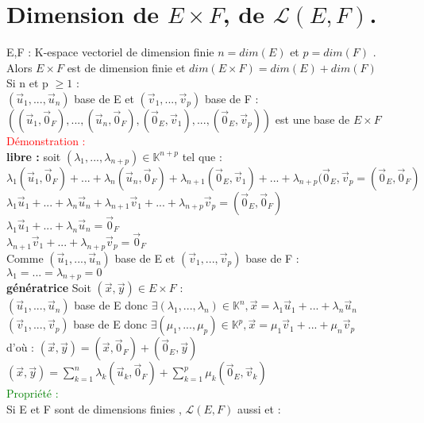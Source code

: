 \documentclass{article}
\begin{document}
\section{Dimension de $E \times F$, de $\mathcal L(E,F)$.}
E,F : K-espace vectoriel de dimension finie $n=dim(E)$ et $p=dim(F)$ . \\
Alors $E \times F$ est de dimension finie et $dim(E \times F)=dim(E) +dim(F)$ \\
Si n et p $\geq 1$ : \\
$(\vec u_1,..., \vec u_n)$ base de E et $(\vec v_1, ...,\vec v_p)$ base de F : \\
$((\vec u_1,\vec 0_F),...,(\vec u_n, \vec 0_F),(\vec 0_E, \vec v_1),...,(\vec 0_E, \vec v_p))$ est une base de $E \times F$ \\
\textcolor{red}{Démonstration :} \\
{\bf libre :} soit $(\lambda_1,...,\lambda_{n+p}) \in \mathbb K^{n+p}$ tel que : \\
$\lambda_1 (\vec u_1, \vec 0_F)+...+ \lambda_n (\vec u_n, \vec 0_F)+ \lambda_{n+1} (\vec 0_E, \vec v_1)+...+ \lambda_{n+p}(\vec 0_E, \vec v_p =(\vec 0_E, \vec 0_F)$ \\
$\lambda_1 \vec u_1+...+ \lambda_n \vec u_n + \lambda_{n+1}  \vec v_1 +...+ \lambda_{n+p} \vec v_p =(\vec 0_E, \vec 0_F)$ \\
$\lambda_1 \vec u_1+...+ \lambda_n \vec u_n =\vec 0_F$ \\
$\lambda_{n+1}  \vec v_1 +...+ \lambda_{n+p} \vec v_p =\vec 0_F$ \\
Comme $(\vec u_1,..., \vec u_n)$ base de E et $(\vec v_1,...,\vec v_p)$ base de F : \\
$\lambda_1=...=\lambda_{n+p}=0$ \\
{\bf génératrice} Soit $(\vec x, \vec y) \in E \times F$ : \\
$(\vec u_1,..., \vec u_n)$ base de E donc $\exists (\lambda_1,..., \lambda_n) \in \mathbb K^n, \vec x =\lambda_1 \vec u_1+...+ \lambda_n \vec u_n$ \\
$(\vec v_1,..., \vec v_p)$ base de E donc $\exists (\mu_1,..., \mu_p) \in \mathbb K^p, \vec x =\mu_1 \vec v_1+...+ \mu_n \vec v_p$ \\
d'où : $(\vec x, \vec y)= (\vec x, \vec 0_F)+ (\vec 0_E, \vec y)$ \\
$(\vec x, \vec y)=\sum_{k=1}^n \lambda_k (\vec u_k, \vec 0_F)+ \sum_{k=1}^p \mu_k (\vec 0_E, \vec v_k)$ \\
\textcolor{green}{Propriété :} \\
Si E et F sont de dimensions finies , $\mathcal L (E,F)$ aussi et : \\
\end{document}
